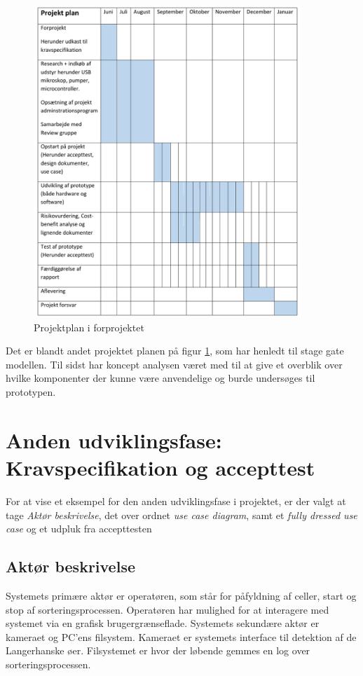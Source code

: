 \begin{figure}[H]
	\centering
	\includegraphics[width=0.9\textwidth]{billeder/Hovedrapport/forprojektplan.pdf}
	\caption{Projektplan i forprojektet}
	\label{fig:forprojekt}
\end{figure}
Det er blandt andet projektet planen på figur \ref{fig:forprojekt}, som har henledt til stage gate modellen. Til sidst har koncept analysen været med til at give et overblik over hvilke komponenter der kunne være anvendelige og burde undersøges til prototypen.
 
\section{Anden udviklingsfase: Kravspecifikation og accepttest}
\label{subsec:krav}
For at vise et eksempel for den anden udviklingsfase i projektet, er der valgt at tage \textit{Aktør beskrivelse}, det over ordnet \textit{use case diagram}, samt et \textit{fully dressed use case} og et udpluk fra accepttesten


\subsection{Aktør beskrivelse}
Systemets primære aktør er operatøren, som står for påfyldning af celler, start og stop af sorteringsprocessen. Operatøren har mulighed for at interagere med systemet via en grafisk brugergrænseflade. Systemets sekundære aktør er kameraet og PC’ens filsystem. Kameraet er systemets interface til detektion af de Langerhanske øer. Filsystemet er hvor der løbende gemmes en log over sorteringsprocessen.
\newpage
